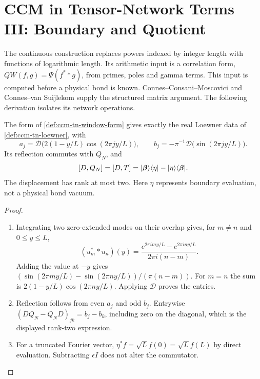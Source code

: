 
\section{CCM in Tensor-Network Terms III: Boundary and Quotient}
\label{sec:ccm-tn-algorithm}

The continuous construction replaces powers indexed by integer length
with functions of logarithmic length. Its arithmetic input is a
correlation form, $QW(f,g)=\Psi(f^**g)$, from primes, poles and gamma
terms. This input is computed before a physical bond is known.
Connes--Consani--Moscovici \cite{connes2025zeta} and
Connes--van Suijlekom \cite{connes2025quadratic} supply the structured
matrix argument. The following derivation isolates its network operations.

\begin{proposition}
\label{prop:ccm-tn-loewner-displacement}
The form of \cref{def:ccm-tn-window-form} gives exactly the real
Loewner data of \cref{def:ccm-tn-loewner}, with
\[
 a_j=\mathcal D\bigl(2(1-y/L)\cos(2\pi jy/L)\bigr),\qquad
 b_j=-\pi^{-1}\mathcal D\bigl(\sin(2\pi jy/L)\bigr).
\]
Its reflection commutes with $Q_N$, and
\[
 [D,Q_N]=[D,T]=|\boldsymbol{\beta}\rangle\langle\eta|
                    -|\eta\rangle\langle\boldsymbol{\beta}|.
\]
The displacement has rank at most two. Here $\eta$ represents
boundary evaluation, not a physical bond vacuum.
\end{proposition}
\begin{proof}
\begin{enumerate}
\item[$\langle1\rangle$1.] Integrating two zero-extended modes on
their overlap gives, for $m\ne n$ and $0\leq y\leq L$,
\[
 (u_m^**u_n)(y)=
 \frac{e^{2\pi imy/L}-e^{2\pi iny/L}}{2\pi i(n-m)}.
\]
Adding the value at $-y$ gives
$(\sin(2\pi my/L)-\sin(2\pi ny/L))/(\pi(n-m))$.
For $m=n$ the sum is $2(1-y/L)\cos(2\pi ny/L)$.
Applying $\mathcal D$ proves the entries.
\item[$\langle1\rangle$2.] Reflection follows from even $a_j$ and
odd $b_j$. Entrywise $(DQ_N-Q_ND)_{jk}=b_j-b_k$, including zero
on the diagonal, which is the displayed rank-two expression.
\item[$\langle1\rangle$3.] For a truncated Fourier vector,
$\eta^*f=\sqrt L f(0)=\sqrt L f(L)$ by direct evaluation.
Subtracting $\epsilon I$ does not alter the commutator.
\end{enumerate}
\end{proof}

